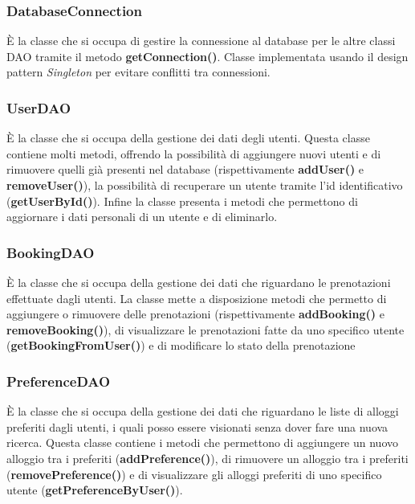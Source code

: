 \documentclass[10pt]{article}
\begin{document}
\subsubsection{DatabaseConnection}

\`E la classe che si occupa di gestire la connessione al database per le altre classi DAO tramite il metodo \textbf{getConnection()}. Classe implementata usando il design pattern \textit{Singleton} per evitare conflitti tra connessioni.

\subsubsection{UserDAO}

\`E la classe che si occupa della gestione dei dati degli utenti. Questa classe contiene molti metodi, offrendo la possibilità di aggiungere nuovi utenti e di rimuovere quelli già presenti nel database (rispettivamente \textbf{addUser()} e \textbf{removeUser()}), la possibilità di recuperare un utente tramite l'id identificativo (\textbf{getUserById()}). Infine la classe presenta i metodi che permettono di aggiornare i dati personali di un utente e di eliminarlo.

\subsubsection{BookingDAO}

\`E la classe che si occupa della gestione dei dati che riguardano le prenotazioni effettuate dagli utenti. La classe mette a disposizione metodi che permetto di aggiungere o rimuovere delle prenotazioni (rispettivamente \textbf{addBooking()} e \textbf{removeBooking()}), di visualizzare le prenotazioni fatte da uno specifico utente (\textbf{getBookingFromUser()}) e di modificare lo stato della prenotazione

\subsubsection{PreferenceDAO}

\`E la classe che si occupa della gestione dei dati che riguardano le liste di alloggi preferiti dagli utenti, i quali posso essere visionati senza dover fare una nuova ricerca. Questa classe contiene i metodi che permettono di aggiungere un nuovo alloggio tra i preferiti (\textbf{addPreference()}), di rimuovere un alloggio tra i preferiti (\textbf{removePreference()}) e di visualizzare gli alloggi preferiti di uno specifico utente (\textbf{getPreferenceByUser()}). 
\end{document}
